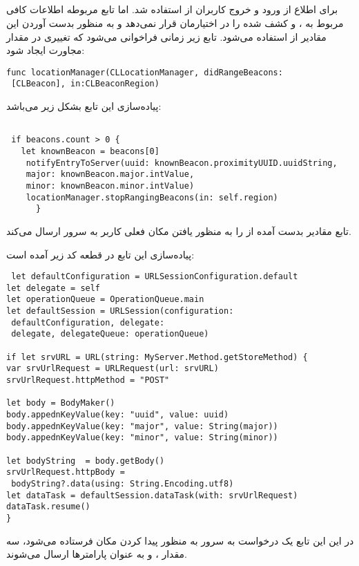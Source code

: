 \documentclass[oneside]{report}
\begin{document}
	\subsection{{\small {}}}
برای اطلاع از ورود و خروج کاربران از
						{\normalsize {}}
	استفاده شد. اما تابع مربوطه اطلاعات کافی مربوط به 
			{\normalsize {}}
			،		{\normalsize {}}
			و 
					{\normalsize {}}
		کشف شده را در اختیارمان قرار نمی‌دهد و به منظور بدست آوردن این مقادیر از 
				{\normalsize {}}
				استفاده می‌شود. تابع زیر زمانی فراخوانی می‌شود که تغییری در مقدار مجاورت ایجاد شود: 
				\begin{latin}
				\begin{verbatim}
func locationManager(CLLocationManager, didRangeBeacons:
 [CLBeacon], in:CLBeaconRegion)
				\end{verbatim}
				
			\end{latin}		
پیاده‌سازی این تابع بشکل زیر می‌باشد: 
\begin{latin}
	\begin{verbatim}
	
 if beacons.count > 0 {
   let knownBeacon = beacons[0]
    notifyEntryToServer(uuid: knownBeacon.proximityUUID.uuidString, 
    major: knownBeacon.major.intValue, 
    minor: knownBeacon.minor.intValue)
    locationManager.stopRangingBeacons(in: self.region)
      }
	\end{verbatim}
	
\end{latin}		
	تابع 
					{\normalsize {}}
	مقادیر بدست آمده از 
						{\normalsize {}}
						را به منظور یافتن مکان فعلی کاربر به سرور ارسال می‌کند. 
						
						پیاده‌سازی این تابع در قطعه کد زیر آمده است:‌
\begin{latin}
	\begin{verbatim}
 let defaultConfiguration = URLSessionConfiguration.default
let delegate = self
let operationQueue = OperationQueue.main
let defaultSession = URLSession(configuration:
 defaultConfiguration, delegate: 
 delegate, delegateQueue: operationQueue)

if let srvURL = URL(string: MyServer.Method.getStoreMethod) {
var srvUrlRequest = URLRequest(url: srvURL)
srvUrlRequest.httpMethod = "POST"

let body = BodyMaker()
body.appednKeyValue(key: "uuid", value: uuid)
body.appednKeyValue(key: "major", value: String(major))
body.appednKeyValue(key: "minor", value: String(minor))

let bodyString  = body.getBody()
srvUrlRequest.httpBody =
 bodyString?.data(using: String.Encoding.utf8)
let dataTask = defaultSession.dataTask(with: srvUrlRequest)
dataTask.resume()
}
	\end{verbatim}
	
\end{latin}							
در این این تابع یک درخواست 
						{\normalsize {}}
	به سرور به منظور پیدا کردن مکان فرستاده می‌شود، سه مقدار 
							{\normalsize {}}
												،
																		{\normalsize {}}
																		و 
																								{\normalsize {}}
																								به عنوان پارامتر‌ها ارسال می‌شوند. 
\end{document}
